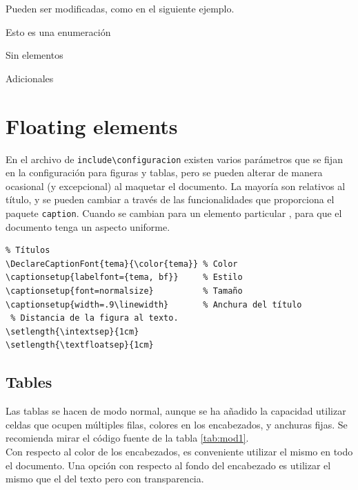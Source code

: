Pueden ser modificadas, como en el siguiente ejemplo.

\begin{enumerate}[labelindent=\parindent ,leftmargin=*,label=\mbox{\bft{[Re \arabic*]}}]
\setcounter{enumi}{7}
\item Esto es una enumeración
\item Sin elementos
\item Adicionales
\end{enumerate}


\section{Floating elements}

En el archivo de \verb+include\configuracion+ existen varios parámetros que se fijan en la configuración para figuras y tablas, pero se pueden alterar de manera ocasional (y excepcional) al maquetar el documento. La mayoría son relativos al título, y se pueden cambiar a través de las funcionalidades que proporciona el paquete \verb+caption+. Cuando se cambian para un elemento particular , para que el documento tenga un aspecto uniforme.

\begin{verbatim}
% Títulos
\DeclareCaptionFont{tema}{\color{tema}} % Color
\captionsetup{labelfont={tema, bf}}     % Estilo
\captionsetup{font=normalsize}          % Tamaño
\captionsetup{width=.9\linewidth}       % Anchura del título
 % Distancia de la figura al texto.
\setlength{\intextsep}{1cm} 
\setlength{\textfloatsep}{1cm}         
\end{verbatim}

\subsection{Tables}
Las tablas se hacen de modo normal, aunque se ha añadido la capacidad utilizar celdas que ocupen múltiples filas, colores en los encabezados, y anchuras fijas. Se recomienda mirar el código fuente de la tabla \ref{tab:mod1}.\\

Con respecto al color de los encabezados, es conveniente utilizar el mismo en todo el documento. Una opción con respecto al fondo del encabezado es utilizar el mismo que el del texto pero con transparencia. \\



\newcommand{\bi}{\bfn{ES}/\bfr{EN}}
\newcommand{\esp}{\bfn{ES}}
\newcommand{\eng}{\bfr{EN}}

